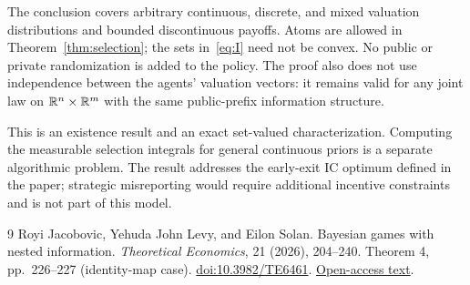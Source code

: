 \documentclass[11pt]{extarticle}
\begin{document}
The conclusion covers arbitrary continuous, discrete, and mixed
valuation distributions and bounded discontinuous payoffs. Atoms are
allowed in Theorem~\ref{thm:selection}; the sets in~\eqref{eq:I} need
not be convex. No public or private randomization is added to the
policy. The proof also does not use independence between the agents'
valuation vectors: it remains valid for any joint law on
$\mathbb{R}^n\times\mathbb{R}^m$ with the same public-prefix information structure.

This is an existence result and an exact set-valued characterization.
Computing the measurable selection integrals for general continuous
priors is a separate algorithmic problem. The result addresses the
early-exit IC optimum defined in the paper; strategic misreporting would
require additional incentive constraints and is not part of this model.

\begin{thebibliography}{9}
Royi Jacobovic, Yehuda John Levy, and Eilon Solan.
\newblock Bayesian games with nested information.
\newblock \emph{Theoretical Economics}, 21 (2026), 204--240.
\newblock Theorem 4, pp.~226--227 (identity-map case).
\newblock \href{https://doi.org/10.3982/TE6461}{doi:10.3982/TE6461}.
\newblock \href{https://eprints.gla.ac.uk/362558/2/362558.pdf}{Open-access text}.
\end{thebibliography}
\end{document}
